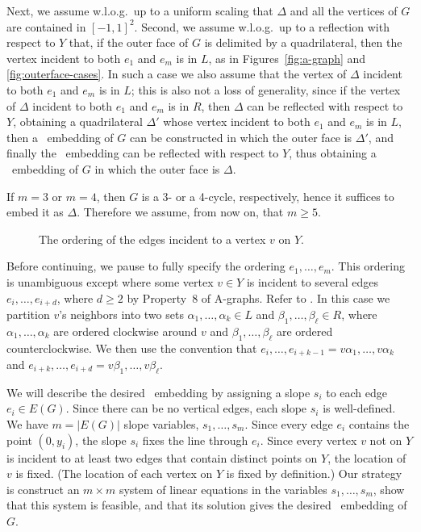 Next, we assume w.l.o.g.\ up to a uniform scaling that $\Delta$ and all the vertices of $G$ are contained in $[-1,1]^2$. Second, we assume w.l.o.g.\ up to a reflection  with respect to $Y$ that, if the outer face of $G$ is delimited by a quadrilateral, then the vertex incident to both $e_1$ and $e_m$ is in $L$, as in Figures~\ref{fig:a-graph} and \ref{fig:outerface-cases}. In such a case we also assume that the vertex of $\Delta$ incident to both $e_1$ and $e_m$ is in $L$; this is also not a loss of generality, since if the vertex of $\Delta$ incident to both $e_1$ and $e_m$ is in $R$, then $\Delta$ can be reflected with respect to $Y$, obtaining a quadrilateral $\Delta'$ whose vertex incident to both $e_1$ and $e_m$ is in $L$, then a \Fary\ embedding of $G$ can be constructed in which the outer face is $\Delta'$, and finally the \Fary\ embedding can be reflected with respect to $Y$, thus obtaining a \Fary\ embedding of $G$ in which the outer face is $\Delta$. 

If $m=3$ or $m=4$, then $G$ is a 3- or a 4-cycle, respectively, hence it suffices to embed it as $\Delta$. Therefore we assume, from now on, that $m\ge 5$.  

\begin{figure}
		\caption{The ordering of the edges incident to a vertex $v$ on $Y$.}
\end{figure}
Before continuing, we pause to fully specify the ordering
$e_1,\ldots,e_m$. This ordering is unambiguous except where
some vertex $v\in Y$ is incident to several edges
$e_{i},\ldots,e_{i+d}$, where $d\ge 2$ by Property~8 of A-graphs. Refer to .  In this case we partition $v$'s neighbors into two
sets $\alpha_1,\ldots,\alpha_k\in L$ and $\beta_1,\ldots,\beta_\ell\in
R$, where $\alpha_1,\ldots,\alpha_k$ are ordered clockwise around $v$
and $\beta_1,\ldots,\beta_\ell$ are ordered counterclockwise.  We then use
the convention that $e_i,\ldots,e_{i+k-1}=v\alpha_1,\ldots,v\alpha_k$
and $e_{i+k},\ldots,e_{i+d}=v\beta_1,\ldots,v\beta_\ell$.

We will describe the desired \Fary\ embedding by assigning a slope $s_i$
to each edge $e_i\in E(G)$.   Since there can be no vertical edges,
each slope $s_i$ is well-defined. We have $m=|E(G)|$ slope variables,
$s_1,\ldots,s_m$.  Since every edge $e_i$ contains the point $(0,y_i)$,
the slope $s_i$ fixes the line through $e_i$.  Since every vertex $v$
not on $Y$ is incident to at least two edges that contain distinct points
on $Y$, the location of $v$ is fixed.  (The location of each vertex on
$Y$ is fixed by definition.)  Our strategy is construct an $m\times m$
system of linear equations in the variables $s_1,\ldots,s_m$, show that
this system is feasible, and that its solution gives the desired \Fary\
embedding of $G$.

